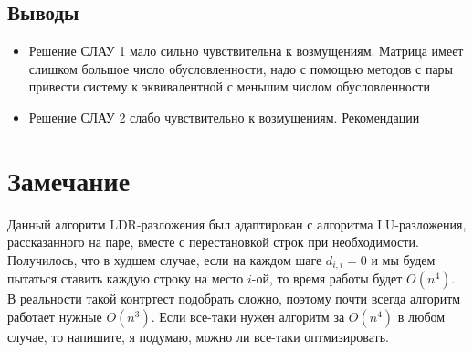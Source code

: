 \documentclass[paper=a4, fontsize=11pt]{scrartcl} %
\numberwithin{equation}{section} %
\numberwithin{figure}{section} %
\numberwithin{table}{section} %
\begin{document}
\subsection{Выводы}
\begin{itemize}
\item Решение СЛАУ 1 мало сильно чувствительна к возмущениям.
\subitem Матрица имеет слишком большое число обусловленности, надо с помощью методов с пары привести систему к эквивалентной с меньшим числом обусловленности

\item Решение СЛАУ 2 слабо чувствительно к возмущениям.
\subitem Рекомендации
\end{itemize}


\section{Замечание}

Данный алгоритм LDR-разложения был адаптирован с алгоритма LU-разложения, рассказанного на паре, вместе с перестановкой строк при необходимости. Получилось, что в худшем случае, если на каждом шаге $d_{i,i}=0$ и мы будем пытаться ставить каждую строку на место $i$-ой, то время работы будет $O(n^4)$. В реальности такой контртест подобрать сложно, поэтому почти всегда алгоритм работает нужные $O(n^3)$. Если все-таки нужен алгоритм за $O(n^4)$ в любом случае, то напишите, я подумаю, можно ли все-таки оптмизировать.
\end{document}
